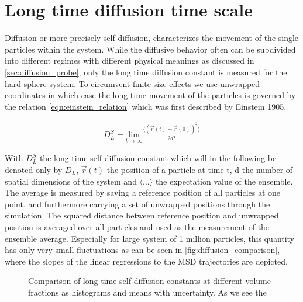 \section{Long time diffusion time scale}
\label{sec:diffusion_metastable_liquid}
Diffusion or more precisely self-diffusion, characterizes the movement of the single particles within the system. While the diffusive behavior often can be subdivided into different regimes with different physical meanings as discussed in \autoref{sec:diffusion_probe}, only the long time diffusion constant is measured for the hard sphere system. To circumvent finite size effects we use unwrapped coordinates in which case the long time movement of the particles is governed by the relation \autoref{eqn:einstein_relation} which was first described by Einstein 1905\cite{Albert1905}.

\begin{align}
\label{eqn:einstein_relation}
D^S_L = \underset{t\rightarrow \infty}{\text{lim}} \frac{\langle (\vec{r}(t) - \vec{r}(0) )^2 \rangle}{2 d t}
\end{align}

With $D^S_L$ the long time self-diffusion constant which will in the following be denoted only by $D_L$, $\vec{r}(t)$ the position of a particle at time t, d the number of spatial dimensions of the system and $\langle ... \rangle$ the expectation value of the ensemble.\\

The average is measured by saving a reference position of all particles at one point, and furthermore carrying a set of unwrapped positions through the simulation. The squared distance between reference position and unwrapped position is averaged over all particles and used as the measurement of the ensemble average. Especially for large system of 1 million particles, this quantity has only very small fluctuations as can be seen in \autoref{fig:diffusion_comparison}, where the slopes of the linear regressions to the MSD trajectories are depicted.\\

\begin{figure}[ht]
\begin{center}
 \hspace{0.5cm}
\caption[Long time self-diffusion constant measurements from production data]{Comparison of long time self-diffusion constants at different volume fractions as histograms and means with uncertainty. As we see the }
\label{fig:diffusion_comparison}
\end{center}
\end{figure}

